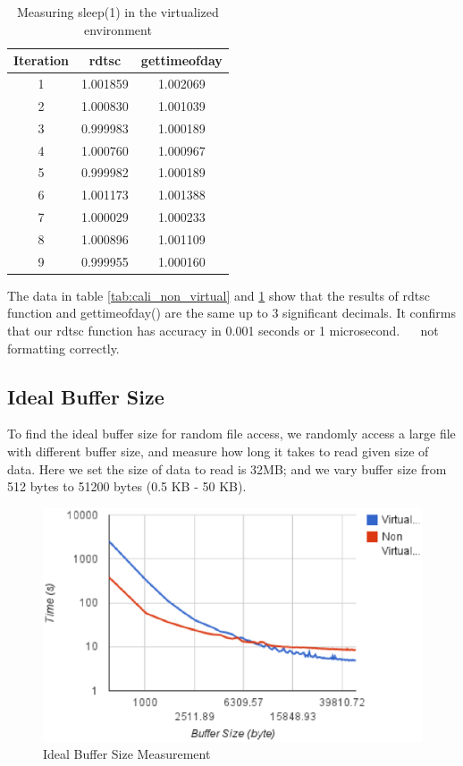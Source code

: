 \begin{table}[!thb]
\centering
\begin{tabular}{|c|c|c|} \hline
Iteration & rdtsc & gettimeofday \\ \hline
1 & 1.001859 & 1.002069 \\ \hline
2 & 1.000830 & 1.001039 \\ \hline
3 & 0.999983 & 1.000189 \\ \hline
4 & 1.000760 & 1.000967 \\ \hline
5 & 0.999982 & 1.000189 \\ \hline
6 & 1.001173 & 1.001388 \\ \hline
7 & 1.000029 & 1.000233 \\ \hline
8 & 1.000896 & 1.001109 \\ \hline
9 & 0.999955 & 1.000160 \\ \hline
\end{tabular}\label{tab:cali_virtual}
\caption{Measuring sleep(1) in the virtualized environment}
\end{table}

The data in table \ref{tab:cali_non_virtual} and \ref{tab:cali_virtual} show that the results of rdtsc function and gettimeofday() are the same up to 3 significant decimals. It confirms that our rdtsc function has accuracy in 0.001 seconds or 1 microsecond.
  
not formatting correctly.

\subsection{Ideal Buffer Size}
To find the ideal buffer size for random file access, we randomly access a large file with different buffer size, and measure how long it takes to read given size of data. Here we set the size of data to read is 32MB; and we vary buffer size from 512 bytes to 51200 bytes (0.5 KB - 50 KB). 

\begin{figure}
\centering
\includegraphics[width=.65\textwidth]{figures/buffer_size.eps}
\caption{Ideal Buffer Size Measurement}
\label{fig:buffer_size}
\end{figure}

